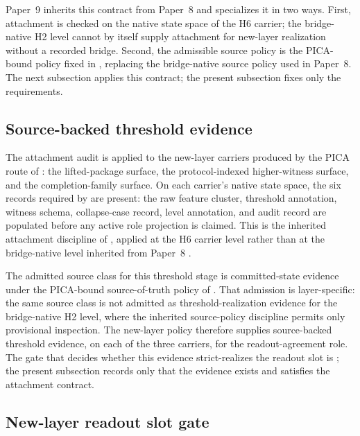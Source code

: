 \documentclass[11pt]{article}
\newcommand{\OldLayer}{H2}
\newcommand{\NewLayer}{H6}
\newcommand{\PaperNine}{Paper~9}
\newcommand{\PaperEight}{Paper~8}
\theoremstyle{definition}
\begin{document}
\PaperNine{} inherits this contract from \PaperEight{}
\cite{Tsiokos2026CarrierToEvent} and specializes it in two ways.  First,
attachment is checked on the native state space of the \NewLayer{} carrier; the
bridge-native \OldLayer{} level cannot by itself supply attachment for
new-layer realization without a recorded bridge.  Second, the admissible source
policy is the PICA-bound policy fixed in , replacing the
bridge-native source policy used in \PaperEight{}.  The next subsection applies
this contract; the present subsection fixes only the requirements.

\subsection{Source-backed threshold evidence}\label{subsec:source-backed-threshold-evidence}

The attachment audit is applied to the new-layer carriers produced by the PICA
route of : the lifted-package surface, the protocol-indexed
higher-witness surface, and the completion-family surface.  On each carrier's
native state space, the six records required by
 are present: the raw feature
cluster, threshold annotation, witness schema, collapse-case record, level
annotation, and audit record are populated before any active role projection is
claimed.  This is the inherited attachment discipline of
\cite{Tsiokos2026FoundationsII}, applied at the \NewLayer{} carrier level rather
than at the bridge-native level inherited from \PaperEight{}
\cite{Tsiokos2026CarrierToEvent}.

The admitted source class for this threshold stage is committed-state evidence
under the PICA-bound source-of-truth policy of .  That
admission is layer-specific: the same source class is not admitted as
threshold-realization evidence for the bridge-native \OldLayer{} level, where
the inherited source-policy discipline permits only provisional inspection.  The
new-layer policy therefore supplies source-backed threshold evidence, on each of
the three carriers, for the readout-agreement role.  The gate that decides
whether this evidence strict-realizes the readout slot is
; the present subsection records only
that the evidence exists and satisfies the attachment contract.

\subsection{New-layer readout slot gate}\label{subsec:new-layer-readout-slot-gate}
\end{document}
